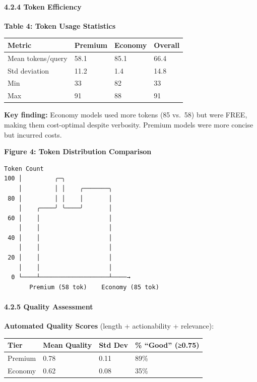 \documentclass[
  11pt,
]{article}
\begin{document}
\hypertarget{token-efficiency}{%
\paragraph{4.2.4 Token Efficiency}\label{token-efficiency}}

\textbf{Table 4: Token Usage Statistics}

\begin{longtable}[]{@{}llll@{}}
\toprule
Metric & Premium & Economy & Overall \\
\midrule
\endhead
Mean tokens/query & 58.1 & 85.1 & 66.4 \\
Std deviation & 11.2 & 1.4 & 14.8 \\
Min & 33 & 82 & 33 \\
Max & 91 & 88 & 91 \\
\bottomrule
\end{longtable}

\textbf{Key finding:} Economy models used more tokens (85 vs.~58) but
were FREE, making them cost-optimal despite verbosity. Premium models
were more concise but incurred costs.

\textbf{Figure 4: Token Distribution Comparison}

\begin{verbatim}
Token Count
100 │         ╭─╮
    │         │ │    ╭───────╮
 80 │         │ │    │       │
    │    ╭────╯ ╰────╯       │
 60 │    │                   │
    │    │                   │
 40 │    │                   │
    │    │                   │
 20 │    │                   │
    │    │                   │
  0 └────┴───────────────────┴────→
       Premium (58 tok)    Economy (85 tok)
\end{verbatim}

\hypertarget{quality-assessment}{%
\paragraph{4.2.5 Quality Assessment}\label{quality-assessment}}

\textbf{Automated Quality Scores} (length + actionability + relevance):

\begin{longtable}[]{@{}llll@{}}
\toprule
Tier & Mean Quality & Std Dev & \% ``Good'' (≥0.75) \\
\midrule
\endhead
Premium & 0.78 & 0.11 & 89\% \\
Economy & 0.62 & 0.08 & 35\% \\
\bottomrule
\end{longtable}
\end{document}
